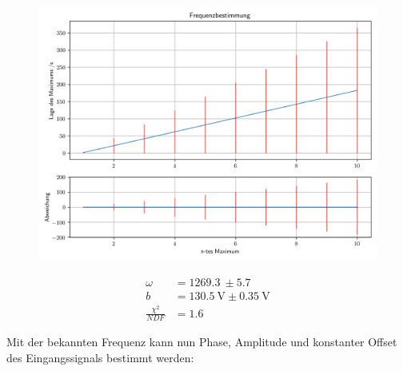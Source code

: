 \documentclass[12pt,twoside,a4paper]{scrartcl}
\begin{document}
			\begin{figure}[H]
				\begin{minipage}{0.69 \textwidth}
					\includegraphics[width =  \textwidth]{Plots/rectifier/FreqBest}
				\end{minipage}
				\begin{minipage}{0.29 \textwidth}
					\begin{align*}
						\omega &= \SI{1269.3}{} \pm \SI{5.7}{} \\
						b &= \SI{130.5}{ \volt } \pm \SI{0.35}{\volt} \\
						\frac{\chi^2}{NDF} &= 1.6
					\end{align*}
				\end{minipage}
			\end{figure}

			Mit der bekannten Frequenz kann nun Phase, Amplitude und konstanter Offset des Eingangssignals bestimmt werden:
\end{document}
